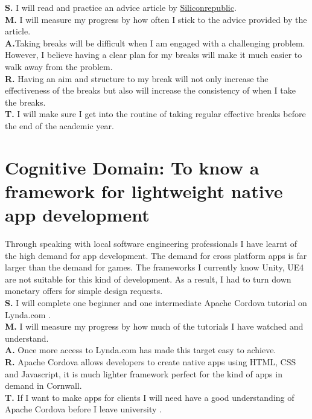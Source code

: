 \documentclass{scrartcl}
\begin{document}
\textbf{S.} I will read and practice an advice article by \href{https://www.siliconrepublic.com/advice/work-breaks-stress-productivity}{Siliconrepublic}.\\
\textbf{M.} I will measure my progress by how often I stick to the advice provided by the article.\\
\textbf{A.}Taking breaks will be difficult when I am engaged with a challenging problem. However, I believe having a clear plan for my breaks will make it much easier to walk away from the problem.\\
\textbf{R.} Having an aim and structure to my break will not only increase the effectiveness of the breaks but also will increase the consistency of when I take the breaks. \\
\textbf{T.} I will make sure I get into the routine of taking regular effective breaks before the end of the academic year. 

\section{Cognitive Domain: To know a framework for lightweight native app development}
 Through speaking with local software engineering professionals I have learnt of the high demand for app development. The demand for cross platform apps is far larger than the demand for games. The frameworks I currently know Unity, UE4  are not suitable for this kind of development. As a result, I had to turn down monetary offers for simple design requests. \\
\textbf{S.} I will complete one beginner and one intermediate Apache Cordova tutorial on Lynda.com .\\
\textbf{M.} I will measure my progress by how much of the tutorials I have watched and understand.\\
\textbf{A.} Once more access to Lynda.com has made this target easy to achieve.\\
\textbf{R.} Apache Cordova allows developers to create native apps using HTML, CSS and Javascript, it is much lighter framework perfect for the kind of apps in demand in Cornwall.\\
\textbf{T.} If I want to make apps for clients I will need have a good understanding of Apache Cordova before I leave university . \\
\end{document}
